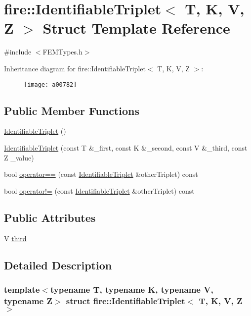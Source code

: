 \hypertarget{a00782}{}\section{fire\+:\+:Identifiable\+Triplet$<$ T, K, V, Z $>$ Struct Template Reference}
\label{a00782}


{\ttfamily \#include $<$F\+E\+M\+Types.\+h$>$}

Inheritance diagram for fire\+:\+:Identifiable\+Triplet$<$ T, K, V, Z $>$\+:\begin{figure}[H]
\begin{center}
\leavevmode
\texttt{[image: a00782]}
\end{center}
\end{figure}
\subsection*{Public Member Functions}
\begin{DoxyCompactItemize}
\item 
\hyperlink{a00782_aadcc9b484d16fc1f286e969bad059976}{Identifiable\+Triplet} ()
\item 
\hyperlink{a00782_a4c43fb95e33d2b67ffb934991a986b68}{Identifiable\+Triplet} (const T \&\+\_\+first, const K \&\+\_\+second, const V \&\+\_\+third, const Z \+\_\+value)
\item 
bool \hyperlink{a00782_a3b79a05585bf33cc7aef48697a804be1}{operator==} (const \hyperlink{a00782}{Identifiable\+Triplet} \&other\+Triplet) const
\item 
bool \hyperlink{a00782_a290e248f174f39b7df8b2017f77c179f}{operator!=} (const \hyperlink{a00782}{Identifiable\+Triplet} \&other\+Triplet) const
\end{DoxyCompactItemize}
\subsection*{Public Attributes}
\begin{DoxyCompactItemize}
\item 
V \hyperlink{a00782_a0f60248b00531643f3c6bb8e68781f04}{third}
\end{DoxyCompactItemize}


\subsection{Detailed Description}
\subsubsection*{template$<$typename T, typename K, typename V, typename Z$>$\newline
struct fire\+::\+Identifiable\+Triplet$<$ T, K, V, Z $>$}

